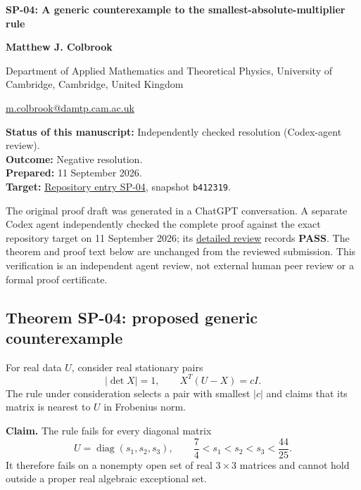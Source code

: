 \documentclass[10pt,a4paper]{article}
\begin{document}
{\raggedright\Large\bfseries SP-04: A generic counterexample to the
smallest-absolute-multiplier rule\par}
\vspace{0.4em}
{\normalsize\bfseries Matthew J. Colbrook\par}
{\small Department of Applied Mathematics and Theoretical Physics,
University of Cambridge, Cambridge, United Kingdom\par}
{\small\href{mailto:m.colbrook@damtp.cam.ac.uk}{m.colbrook@damtp.cam.ac.uk}\par}
\vspace{0.6em}
\textbf{Status of this manuscript:} Independently checked resolution
(Codex-agent review).\\
\textbf{Outcome:} Negative resolution.\\
\textbf{Prepared:} 11 September 2026.\\
\textbf{Target:}
\href{https://github.com/ajt60gaibb/OpenProblemsInNLA/blob/b4123194697bdf6f8f82518c1dd7d6c40a30c2e0/eigenvalues-and-inverse-problems/SP-04/README.md}{Repository
entry SP-04}, snapshot \texttt{b412319}.

The original proof draft was generated in a ChatGPT conversation. A
separate Codex agent independently checked the complete proof against
the exact repository target on 11 September 2026; its
\href{https://github.com/ajt60gaibb/OpenProblemsInNLA/blob/main/references/colbrook-2026-09-11/verification/reviews/SP-04-review.md}{detailed
review} records \textbf{PASS}. The theorem and proof text below are
unchanged from the reviewed submission. This verification is an
independent agent review, not external human peer review or a formal
proof certificate.

\subsection{Theorem SP-04: proposed generic
counterexample}\label{theorem-sp-04-proposed-generic-counterexample}

For real data \(U\), consider real stationary pairs \[
|\det X|=1,\qquad X^T(U-X)=cI.
\] The rule under consideration selects a pair with smallest \(|c|\) and
claims that its matrix is nearest to \(U\) in Frobenius norm.

\textbf{Claim.} The rule fails for every diagonal matrix \[
U=\operatorname{diag}(s_1,s_2,s_3),\qquad
\frac74<s_1<s_2<s_3<\frac{44}{25}.
\] It therefore fails on a nonempty open set of real \(3\times3\)
matrices and cannot hold outside a proper real algebraic exceptional
set.
\end{document}
